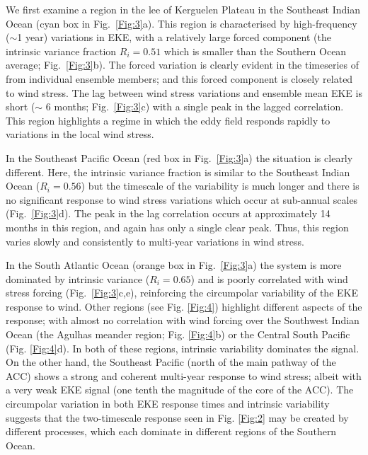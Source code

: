 \documentclass{agujournal2019}
\begin{document}
We first examine a region in the lee of Kerguelen Plateau in the Southeast Indian Ocean (cyan box in Fig.~\ref{Fig:3}a).
This region is characterised by high-frequency ($\sim$1 year) variations in EKE, with a relatively large forced component (the intrinsic variance fraction $R_i = 0.51$ which is smaller than the Southern Ocean average; Fig.~\ref{Fig:3}b).
The forced variation is clearly evident in the timeseries of from individual ensemble members; and this forced component is closely related to wind stress.
The lag between wind stress variations and ensemble mean EKE is short ($\sim$ 6 months; Fig.~\ref{Fig:3}c) with a single peak in the lagged correlation.
This region highlights a regime in which the eddy field responds rapidly to variations in the local wind stress.

In the Southeast Pacific Ocean (red box in Fig.~\ref{Fig:3}a) the situation is clearly different.
Here, the intrinsic variance fraction is similar to the Southeast Indian Ocean ($R_i=0.56$) but the timescale of the variability is much longer and there is no significant response to wind stress variations which occur at sub-annual scales (Fig.~\ref{Fig:3}d).
The peak in the lag correlation occurs at approximately 14 months in this region, and again has only a single clear peak.
Thus, this region varies slowly and consistently to multi-year variations in wind stress.

In the South Atlantic Ocean (orange box in Fig.~\ref{Fig:3}a) the system is more dominated by intrinsic variance ($R_i=0.65$) and is poorly correlated with wind stress forcing (Fig.~\ref{Fig:3}c,e), reinforcing the circumpolar variability of the EKE response to wind.
Other regions (see Fig. \ref{Fig:4}) highlight different aspects of the response;  with almost no correlation with wind forcing over the Southwest Indian Ocean (the Agulhas meander region; Fig. \ref{Fig:4}b) or the Central South Pacific (Fig. \ref{Fig:4}d).
In both of these regions, intrinsic variability dominates the signal.
On the other hand, the Southeast Pacific (north of the main pathway of the ACC) shows a strong and coherent multi-year response to wind stress; albeit with a very weak EKE signal (one tenth the magnitude of the core of the ACC).
The circumpolar variation in both EKE response times and intrinsic variability suggests that the two-timescale response seen in Fig. \ref{Fig:2} may be created by different processes, which each dominate in different regions of the Southern Ocean.
\end{document}
